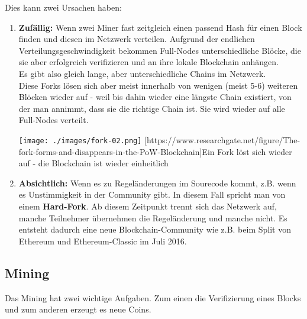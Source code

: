 \documentclass[10pt,a4paper,titlepage]{article}
\begin{document}
 Dies kann zwei Ursachen haben:
 \begin{enumerate}
 \item \textbf{Zufällig:} Wenn zwei Miner fast zeitgleich einen passend Hash für einen Block finden und diesen im Netzwerk verteilen. Aufgrund der endlichen Verteilungsgeschwindigkeit bekommen Full-Nodes unterschiedliche Blöcke, die sie aber erfolgreich verifizieren und an ihre lokale Blockchain anhängen.\\ Es gibt also gleich lange, aber unterschiedliche Chains im Netzwerk.\vspace{.4cm}\\
Diese Forks lösen sich aber meist innerhalb von wenigen (meist 5-6) weiteren Blöcken wieder auf - weil bis dahin wieder eine längste Chain existiert, von der man annimmt, dass sie die richtige Chain ist. Sie wird wieder auf alle Full-Nodes verteilt.
\begin{center}
\texttt{[image: ./images/fork-02.png]}
[https://www.researchgate.net/figure/The-fork-forms-and-disappears-in-the-PoW-Blockchain]{Ein Fork löst sich wieder auf - die Blockchain ist wieder einheitlich}
\end{center}

\item \textbf{Absichtlich:} Wenn es zu Regeländerungen im Sourecode kommt, z.B. wenn es Unstimmigkeit in der Community gibt. In diesem Fall spricht man von einem \textbf{Hard-Fork}. Ab diesem Zeitpunkt trennt sich das Netzwerk auf, manche Teilnehmer übernehmen die Regeländerung und manche nicht. Es entsteht dadurch eine neue Blockchain-Community wie z.B. beim Split von Ethereum und Ethereum-Classic im Juli 2016.
\end{enumerate}

\subsection{Mining} \label{mining}
Das Mining hat zwei wichtige Aufgaben. Zum einen die Verifizierung eines Blocks und zum anderen erzeugt es neue Coins.
\end{document}
